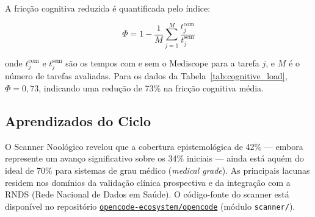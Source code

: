 A fricção cognitiva reduzida é quantificada pelo índice:

\begin{equation}
\Phi = 1 - \frac{1}{M} \sum_{j=1}^M \frac{t_j^{\text{com}}}{t_j^{\text{sem}}}
\label{eq:cognitive_friction}
\end{equation}

onde $t_j^{\text{com}}$ e $t_j^{\text{sem}}$ são os tempos com e sem o Mediscope para a tarefa $j$, e $M$ é o número de tarefas avaliadas. Para os dados da Tabela~\ref{tab:cognitive_load}, $\Phi = 0{,}73$, indicando uma redução de 73\% na fricção cognitiva média.

\subsection*{Aprendizados do Ciclo}

O Scanner Noológico revelou que a cobertura epistemológica de 42\% --- embora represente um avanço significativo sobre os 34\% iniciais --- ainda está aquém do ideal de 70\% para sistemas de grau médico (\textit{medical grade}). As principais lacunas residem nos domínios da validação clínica prospectiva e da integração com a RNDS (Rede Nacional de Dados em Saúde). O código-fonte do scanner está disponível no repositório \href{https://github.com/opencode-ecosystem/opencode}{\texttt{opencode-ecosystem/opencode}} (módulo \texttt{scanner/}).
